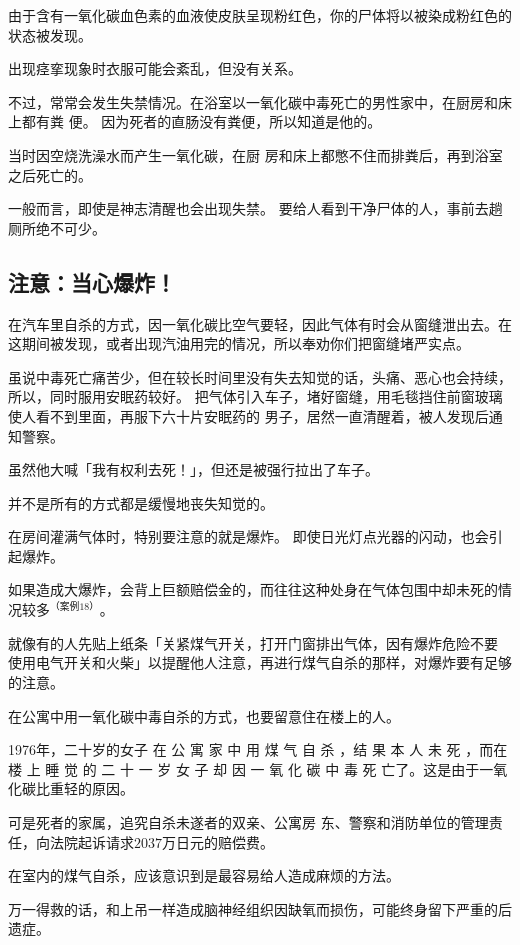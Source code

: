 \documentclass[UTF8]{ctexart}
\begin{document}
由于含有一氧化碳血色素的血液使皮肤呈现粉红色，你的尸体将以被染成粉红色的状态被发现。

出现痉挛现象时衣服可能会紊乱，但没有关系。

不过，常常会发生失禁情况。在浴室以一氧化碳中毒死亡的男性家中，在厨房和床上都有粪 便。
因为死者的直肠没有粪便，所以知道是他的。

当时因空烧洗澡水而产生一氧化碳，在厨 房和床上都憋不住而排粪后，再到浴室之后死亡的。

一般而言，即使是神志清醒也会出现失禁。
要给人看到干净尸体的人，事前去趟厕所绝不可少。

\subsection{注意：当心爆炸！}

在汽车里自杀的方式，因一氧化碳比空气要轻，因此气体有时会从窗缝泄出去。在这期间被发现，或者出现汽油用完的情况，所以奉劝你们把窗缝堵严实点。

虽说中毒死亡痛苦少，但在较长时间里没有失去知觉的话，头痛、恶心也会持续，所以，同时服用安眠药较好。
把气体引入车子，堵好窗缝，用毛毯挡住前窗玻璃使人看不到里面，再服下六十片安眠药的 男子，居然一直清醒着，被人发现后通知警察。

虽然他大喊「我有权利去死！」，但还是被强行拉出了车子。

并不是所有的方式都是缓慢地丧失知觉的。 

在房间灌满气体时，特别要注意的就是爆炸。
即使日光灯点光器的闪动，也会引起爆炸。

如果造成大爆炸，会背上巨额赔偿金的，而往往这种处身在气体包围中却未死的情况较多$^{（案例 18）}$。

就像有的人先贴上纸条「关紧煤气开关，打开门窗排出气体，因有爆炸危险不要 使用电气开关和火柴」以提醒他人注意，再进行煤气自杀的那样，对爆炸要有足够的注意。

在公寓中用一氧化碳中毒自杀的方式，也要留意住在楼上的人。

1976年，二十岁的女子 在 公 寓 家 中 用 煤 气 自 杀 ，结 果 本 人 未 死 ，而在 楼 上 睡 觉 的 二 十 一 岁 女 子 却 因 一 氧 化 碳 中 毒 死 亡了。这是由于一氧化碳比重轻的原因。

可是死者的家属，追究自杀未遂者的双亲、公寓房 东、警察和消防单位的管理责任，向法院起诉请求$2037$万日元的赔偿费。

在室内的煤气自杀，应该意识到是最容易给人造成麻烦的方法。

万一得救的话，和上吊一样造成脑神经组织因缺氧而损伤，可能终身留下严重的后遗症。
\end{document}
